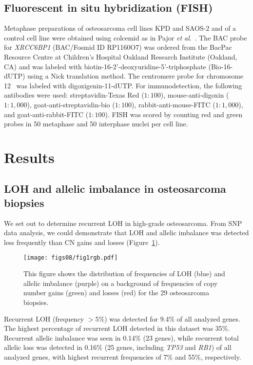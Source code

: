 \subsection{Fluorescent in situ hybridization (FISH)}
Metaphase preparations of osteosarcoma cell lines KPD and SAOS-2 and of a control cell line were obtained using colcemid as in Pajor {\it et al}.~\cite{pajor1998combined}. The BAC probe for {\it XRCC6BP1} (BAC/Fosmid ID RP1160O7) was ordered from the BacPac Resource Centre at Children's Hospital Oakland Research Institute (Oakland, CA) and was labeled with biotin\hyp{}16-2'\hyp{}deoxyuridine\hyp{}5'\hyp{}triphosphate (Bio-16-dUTP) using a Nick translation method. The centromere probe for chromosome 12~\cite{pajor1998combined} was labeled with digoxigenin\hyp{}11-dUTP. For immunodetection, the following antibodies were used: streptavidin\hyp{}Texas Red ($1:100$), mouse\hyp{}anti\hyp{}digoxin ($1:1,000$), goat\hyp{}anti\hyp{}streptavidin\hyp{}bio ($1:100$), rabbit\hyp{}anti\hyp{}mouse\hyp{}FITC ($1:1,000$), and goat\hyp{}anti\hyp{}rabbit\hyp{}FITC ($1:100$). FISH was scored by counting red and green probes in 50 metaphase and 50 interphase nuclei per cell line.

\section{Results}\label{results8}
\subsection{LOH and allelic imbalance in osteosarcoma biopsies}
We set out to determine recurrent LOH in high\hyp{}grade osteosarcoma. From SNP data analysis, we could demonstrate that LOH and allelic imbalance was detected less frequently than CN gains and losses (Figure~\ref{fig8.1}).
%
\begin{figure}[htbp]
	\centering
	\texttt{[image: figs08/fig1rgb.pdf]}	%
	\caption{This figure shows the distribution of frequencies of LOH (blue) and allelic imbalance (purple) on a background of frequencies of copy number gains (green) and losses (red) for the 29 osteosarcoma biopsies.}	%
	\label{fig8.1}
\end{figure}
%
Recurrent LOH (frequency $>5\%$) was detected for 9.4\% of all analyzed genes. The highest percentage of recurrent LOH detected in this dataset was 35\%. Recurrent allelic imbalance was seen in 0.14\% (23 genes), while recurrent total allelic loss was detected in 0.16\% (25 genes, including {\it TP53} and {\it RB1}) of all analyzed genes, with highest recurrent frequencies of 7\% and 55\%, respectively.

